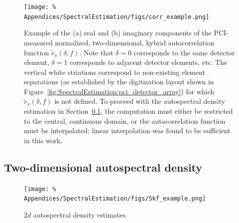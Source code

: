 \label{app:SpectralEstimation:2d_spectra:correlation_function}
\begin{figure}
  \centering
  \texttt{[image: \%
    Appendices/SpectralEstimation/figs/corr\_example.png]}
  \caption[Normalized, $2$d, hybrid autocorrelation function]{%
    Example of the (a) real and (b) imaginary components
    of the PCI-measured normalized, two-dimensional, hybrid
    autocorrelation function $\tilde{r}_x(\delta, f)$.
    Note that $\delta = 0$ corresponds to the same detector element,
    $\delta = 1$ corresponds to adjacent detector elements, etc.
    The vertical white striations correspond to
    non-existing element separations
    (as established by the digitization layout shown in
    Figure~\ref{fig:SpectralEstimation:pci_detector_array})
    for which $\tilde{r}_x(\delta, f)$ is not defined.
    To proceed with the autospectral density estimation
    in Section~\ref{app:SpectralEstimation:2d_spectra:2d_spectra},
    the computation must either be restricted
    to the central, continuous domain, or
    the autocorrelation function must be interpolated;
    linear interpolation was found to be sufficient in this work.
  }
  \label{fig:SpectralEstimation:corr_example}
\end{figure}


\subsection{Two-dimensional autospectral density}
\label{app:SpectralEstimation:2d_spectra:2d_spectra}
\begin{figure}
  \centering
  \texttt{[image: \%
    Appendices/SpectralEstimation/figs/Skf\_example.png]}
  \caption[$2d$ autospectral density estimates]{%
    $2d$ autospectral density estimates.
  }
  \label{fig:SpectralEstimation:Skf_example}
\end{figure}




